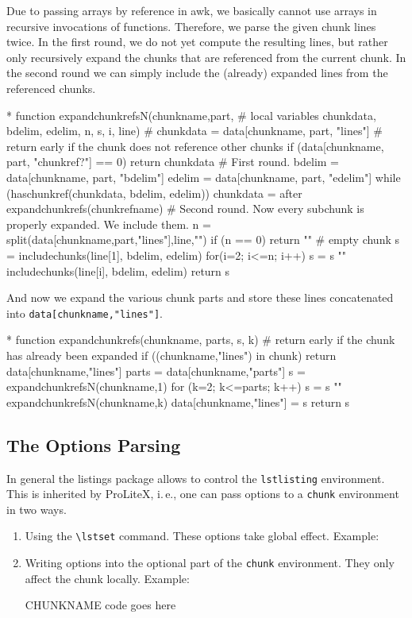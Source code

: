 \documentclass[a4paper]{article} %
\newcommand{\packagename}[1]{{\normalfont\sffamily#1}}
\newcommand\ProLiteX{\textsf{ProLiteX}}
\newcommand{\ie}{i.\,e.}
\begin{document}
Due to passing arrays by reference in \packagename{awk}, we basically
cannot use arrays in recursive invocations of functions. Therefore, we
parse the given chunk lines twice. In the first round, we do not yet
compute the resulting lines, but rather only recursively expand the
chunks that are referenced from the current chunk. In the second round
we can simply include the (already) expanded lines from the referenced
chunks.
\begin{chunk}{*}
function expandchunkrefsN(chunkname,part,
  # local variables
  chunkdata, bdelim, edelim, n, s, i, line) {
  #
  chunkdata = data[chunkname, part, "lines"]
  # return early if the chunk does not reference other chunks
  if (data[chunkname, part, "chunkref?"] == 0) { return chunkdata }
  # First round.
  bdelim = data[chunkname, part, "bdelim"]
  edelim = data[chunkname, part, "edelim"]
  while (haschunkref(chunkdata, bdelim, edelim)) {
    chunkdata = after
    expandchunkrefs(chunkrefname)
  }
  # Second round. Now every subchunk is properly expanded. We include them.
  n = split(data[chunkname,part,"lines"],line,"\n")
  if (n == 0) {return ""} # empty chunk
  s = includechunks(line[1], bdelim, edelim)
  for(i=2; i<=n; i++) {s = s "\n" includechunks(line[i], bdelim, edelim)}
  return s
}
\end{chunk}

And now we expand the various chunk parts and store these lines
concatenated into \texttt{data[chunkname,"lines"]}.
\begin{chunk}{*}
function expandchunkrefs(chunkname,   parts, s, k) {
  # return early if the chunk has already been expanded
  if ((chunkname,"lines") in chunk) { return data[chunkname,"lines"] }
  parts = data[chunkname,"parts"]
  s = expandchunkrefsN(chunkname,1)
  for (k=2; k<=parts; k++) {s = s "\n" expandchunkrefsN(chunkname,k)}
  data[chunkname,"lines"] = s
  return s
}
\end{chunk}

\subsection{The Options Parsing}\label{sec:parsing}
In general the \packagename{listings} package allows to control the
\texttt{lstlisting} environment. This is inherited by \ProLiteX{},
\ie, one can pass options to a \texttt{chunk} environment in two ways.
\begin{enumerate}
\item Using the \verb'\lstset' command. These options take global
  effect. Example:
\begin{myverbatim}
\end{myverbatim}
\item Writing options into the optional part of the \texttt{chunk}
  environment. They only affect the chunk locally. Example:
\begin{myverbatim}
  \begin{chunk}[chunkref={<'}{'>},gobble=2]{CHUNKNAME}
    code goes here
  \end{chunk}
\end{myverbatim}
\end{enumerate}
\end{document}
